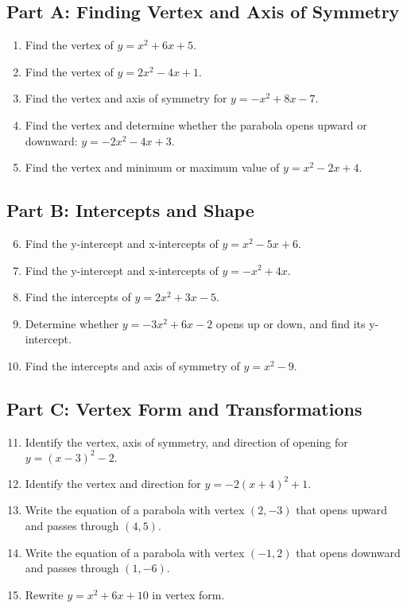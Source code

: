 \documentclass[12pt]{article}
\begin{document}
\subsection*{Part A: Finding Vertex and Axis of Symmetry}
\begin{enumerate}
  \item Find the vertex of \(y = x^2 + 6x + 5.\)
  \item Find the vertex of \(y = 2x^2 - 4x + 1.\)
  \item Find the vertex and axis of symmetry for \(y = -x^2 + 8x - 7.\)
  \item Find the vertex and determine whether the parabola opens upward or downward: \(y = -2x^2 - 4x + 3.\)
  \item Find the vertex and minimum or maximum value of \(y = x^2 - 2x + 4.\)
\end{enumerate}

\subsection*{Part B: Intercepts and Shape}
\begin{enumerate}
  \setcounter{enumi}{5}
  \item Find the y-intercept and x-intercepts of \(y = x^2 - 5x + 6.\)
  \item Find the y-intercept and x-intercepts of \(y = -x^2 + 4x.\)
  \item Find the intercepts of \(y = 2x^2 + 3x - 5.\)
  \item Determine whether \(y = -3x^2 + 6x - 2\) opens up or down, and find its y-intercept.
  \item Find the intercepts and axis of symmetry of \(y = x^2 - 9.\)
\end{enumerate}

\subsection*{Part C: Vertex Form and Transformations}
\begin{enumerate}
  \setcounter{enumi}{10}
  \item Identify the vertex, axis of symmetry, and direction of opening for \(y = (x - 3)^2 - 2.\)
  \item Identify the vertex and direction for \(y = -2(x + 4)^2 + 1.\)
  \item Write the equation of a parabola with vertex \((2, -3)\) that opens upward and passes through \((4, 5)\).
  \item Write the equation of a parabola with vertex \((-1, 2)\) that opens downward and passes through \((1, -6)\).
  \item Rewrite \(y = x^2 + 6x + 10\) in vertex form.
\end{enumerate}
\end{document}
